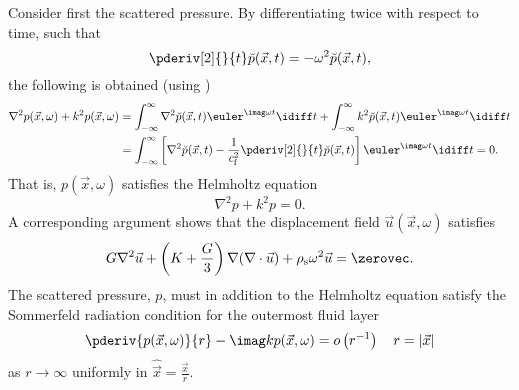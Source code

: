 Consider first the scattered pressure. By differentiating  twice with respect to time, such that
\begin{equation}
	\pderiv[2]{}{t}\breve{p}(\vec{x},t) = -\omega^2\breve{p}(\vec{x},t),
\end{equation}
the following is obtained (using )
\begin{align*}
	\nabla^2 p(\vec{x},\omega) + k^2 p(\vec{x},\omega) &= \int_{-\infty}^\infty \nabla^2\breve{p}(\vec{x},t)\euler^{\imag \omega t}\idiff t + \int_{-\infty}^\infty k^2 \breve{p}(\vec{x},t)\euler^{\imag \omega t}\idiff t\\
	&= \int_{-\infty}^\infty \left[\nabla^2\breve{p}(\vec{x},t)-\frac{1}{c_{\mathrm{f}}^2}\pderiv[2]{}{t}\breve{p}(\vec{x},t)\right]\euler^{\imag \omega t}\idiff t = 0.
\end{align*}
That is, $p(\vec{x},\omega)$ satisfies the Helmholtz equation
\begin{equation}\label{Eq1:helmholtz}
	\nabla^2 p + k^2p = 0.
\end{equation}
A corresponding argument shows that the displacement field $\vec{u}(\vec{x},\omega)$ satisfies
\begin{equation}\label{Eq1:navier}
	G\nabla^2\vec{u}+\left(K+\frac{G}{3}\right)\nabla(\nabla \cdot\vec{u}) +\rho_{\mathrm{s}}\omega^2\vec{u} = \zerovec.
\end{equation}
The scattered pressure, $p$, must in addition to the Helmholtz equation satisfy the Sommerfeld radiation condition for the outermost fluid layer~\cite{Sommerfeld1949pde}
\begin{equation}\label{Eq1:Sommerfeld}
	\pderiv{p(\vec{x},\omega)}{r}-\imag k p(\vec{x},\omega) = o\left(r^{-1}\right)\quad r=|\vec{x}|
\end{equation}	
as $r\to\infty$ uniformly in $\hat{\vec{x}}=\frac{\vec{x}}{r}$.

